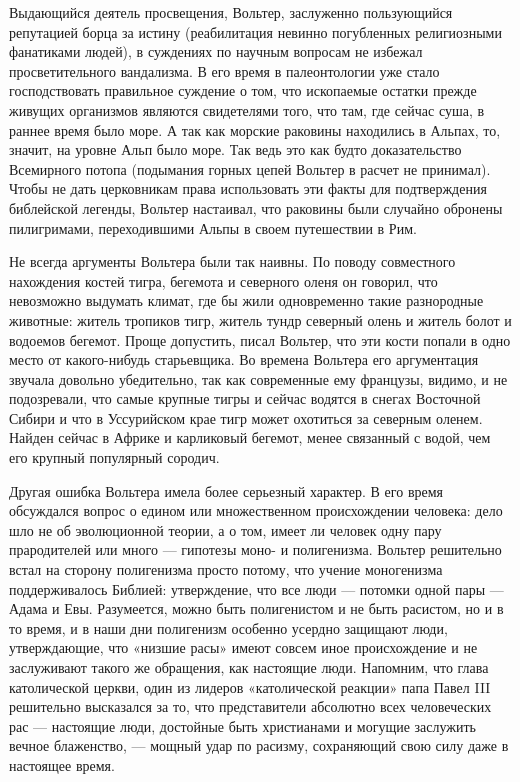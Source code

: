 Выдающийся деятель просвещения, Вольтер, заслуженно пользующийся репутацией
борца за истину (реабилитация невинно погубленных религиозными фанатиками
людей), в суждениях по научным вопросам не избежал просветительного вандализма.
В его время в палеонтологии уже стало господствовать правильное суждение о том,
что ископаемые остатки прежде живущих организмов являются свидетелями того, что
там, где сейчас суша, в раннее время было море. А так как морские раковины
находились в Альпах, то, значит, на уровне Альп было море. Так ведь это как
будто доказательство Всемирного потопа (подымания горных цепей Вольтер в расчет
не принимал). Чтобы не дать церковникам права использовать эти факты для
подтверждения библейской легенды, Вольтер настаивал, что раковины были случайно
обронены пилигримами, переходившими Альпы в своем путешествии в Рим.

Не всегда аргументы Вольтера были так наивны. По поводу совместного нахождения
костей тигра, бегемота и северного оленя он говорил, что невозможно выдумать
климат, где бы жили одновременно такие разнородные животные: житель тропиков
тигр, житель тундр северный олень и житель болот и водоемов бегемот. Проще
допустить, писал Вольтер, что эти кости попали в одно место от какого-нибудь
старьевщика. Во времена Вольтера его аргументация звучала довольно
убедительно, так как современные ему французы, видимо, и не подозревали, что
самые крупные тигры и сейчас водятся в снегах Восточной Сибири и что в
Уссурийском крае тигр может охотиться за северным оленем. Найден сейчас в
Африке и карликовый бегемот, менее связанный с водой, чем его крупный
популярный сородич.

Другая ошибка Вольтера имела более серьезный характер. В его время обсуждался
вопрос о едином или множественном происхождении человека: дело шло не об
эволюционной теории, а о том, имеет ли человек одну пару прародителей или много
--- гипотезы моно- и полигенизма. Вольтер решительно встал на сторону
полигенизма просто потому, что учение моногенизма поддерживалось Библией:
утверждение, что все люди --- потомки одной пары --- Адама и Евы. Разумеется,
можно быть полигенистом и не быть расистом, но и в то время, и в наши дни
полигенизм особенно усердно защищают люди, утверждающие, что «низшие расы»
имеют совсем иное происхождение и не заслуживают такого же обращения, как
настоящие люди. Напомним, что глава католической церкви, один из лидеров
«католической реакции» папа Павел III решительно высказался за то, что
представители абсолютно всех человеческих рас --- настоящие люди, достойные
быть христианами и могущие заслужить вечное блаженство, --- мощный удар по
расизму, сохраняющий свою силу даже в настоящее время.

